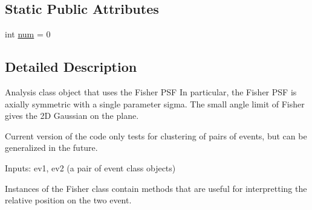 \subsection*{Static Public Attributes}
\begin{DoxyCompactItemize}
\item 
int \hyperlink{classamonpy_1_1anal_1_1cluster_1_1_fisher_a2c44a65df3f24bc786522df8d5aa2db7}{num} = 0
\end{DoxyCompactItemize}


\subsection{Detailed Description}
\begin{DoxyVerb}Analysis class object that uses the Fisher PSF
In particular, the Fisher PSF is axially symmetric with
a single parameter sigma. The small angle limit of Fisher
gives the 2D Gaussian on the plane.

Current version of the code only tests for clustering of
pairs of events, but can be generalized in the future.

Inputs: ev1, ev2 (a pair of event class objects)

Instances of the Fisher class contain methods that are
useful for interpretting the relative position on the
two event. 
\end{DoxyVerb}
 

